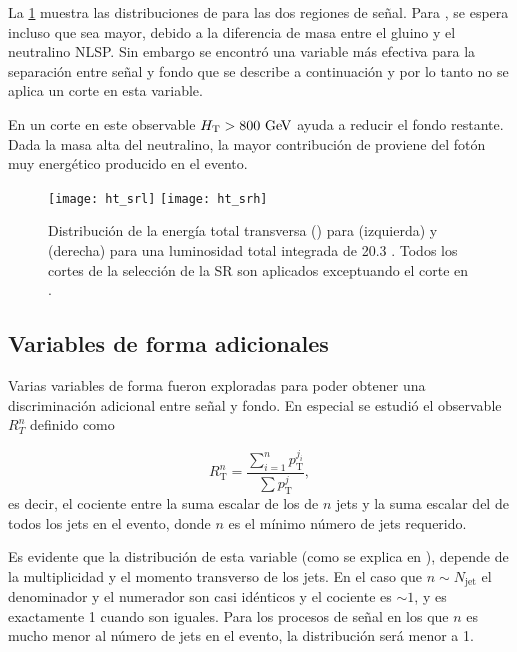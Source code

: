 La \cref{fig:opt_ht} muestra las distribuciones de {\HT} para las dos regiones de señal.
Para {\SRL}, se espera incluso que {\HT} sea mayor, debido a la
diferencia de masa entre el gluino y el neutralino NLSP. Sin embargo
se encontró una variable más efectiva para la separación entre señal y
fondo que se describe a continuación y por lo tanto no se aplica un corte
en esta variable.


En {\SRH} un corte en este observable $\HT>800\gev$ ayuda a reducir el fondo restante.
Dada la masa alta del neutralino, la mayor contribución de {\HT} proviene
del fotón muy energético producido en el evento.


\begin{figure}[!h]
  \centering

  \texttt{[image: ht\_srl]}
  \texttt{[image: ht\_srh]}

  \caption{Distribución de la energía total transversa (\HT) para {\SRL} (izquierda)
    y {\SRH} (derecha) para una luminosidad total integrada de 20.3 \ifb. Todos los cortes de la selección
  de la SR son aplicados exceptuando el corte en {\HT}.}
  \label{fig:opt_ht}
\end{figure}



\subsection{Variables de forma adicionales}\label{sec:shape_vars}

Varias variables de forma fueron exploradas para poder obtener
una discriminación adicional entre señal y fondo. En especial se estudió el
observable $R_T^n$ definido como

\begin{equation}\label{eq:rt_formula}
  R_\mathrm{T}^{n} = \frac{\sum_{i=1}^{n}p_\mathrm{T}^{j_i}}{\sum p_\mathrm{T}^{j}},
\end{equation}
%
es decir, el cociente entre la suma escalar de los {\pt} de $n$ jets y la suma
escalar del {\pt} de todos los jets en el evento, donde $n$ es el mínimo número
de jets requerido.

Es evidente que la distribución de esta variable (como se explica en
\cite{PhysRevD.84.055010}), depende de la multiplicidad y el momento transverso
de los jets. En el caso que $n \sim N_\mathrm{jet}$ el denominador y el
numerador son casi idénticos y el cociente es $\sim 1$, y es exactamente 1
cuando son iguales.
Para los procesos de señal en los que $n$ es mucho menor al número de jets en el
evento, la distribución será menor a 1.

